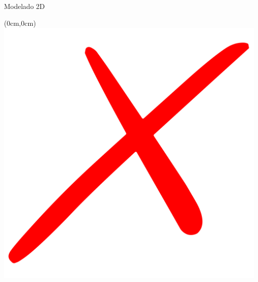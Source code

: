 \documentclass{beamer}
\begin{document}
\begin{frame}{Modelado 2D}
{    %
    \begin{textblock*}{\paperwidth}(0cm,0cm)
        \centering
        \includegraphics[width=0.7\paperwidth]{img/cruz_roja.png}
    \end{textblock*}
}

\end{frame}
\end{document}
